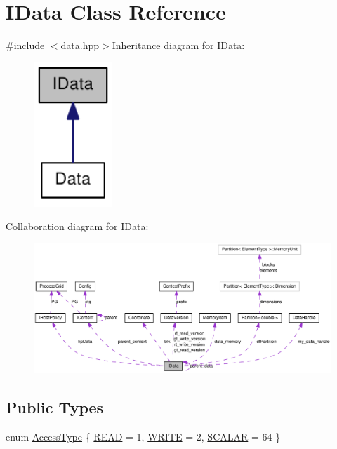 \hypertarget{class_i_data}{
\section{IData Class Reference}
\label{class_i_data}
}


{\ttfamily \#include $<$data.hpp$>$}Inheritance diagram for IData:\nopagebreak
\begin{figure}[H]
\begin{center}
\leavevmode
\includegraphics[width=84pt]{class_i_data__inherit__graph}
\end{center}
\end{figure}
Collaboration diagram for IData:\nopagebreak
\begin{figure}[H]
\begin{center}
\leavevmode
\includegraphics[width=400pt]{class_i_data__coll__graph}
\end{center}
\end{figure}
\subsection*{Public Types}
\begin{DoxyCompactItemize}
\item 
enum \hyperlink{class_i_data_a771c62d4a9d89ea755b61734fb41e372}{AccessType} \{ \hyperlink{class_i_data_a771c62d4a9d89ea755b61734fb41e372ab0001574263456e6fbf9b4355353484c}{READ} =  1, 
\hyperlink{class_i_data_a771c62d4a9d89ea755b61734fb41e372aed5606f3868a90a4b31155ebdf63ed82}{WRITE} =  2, 
\hyperlink{class_i_data_a771c62d4a9d89ea755b61734fb41e372ae74284405073e2c093007eb686e565fa}{SCALAR} = 64
 \}
\end{DoxyCompactItemize}
